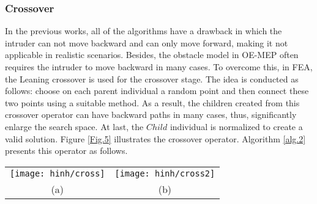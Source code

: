\documentclass[final]{elsarticle}
\begin{document}
\subsubsection{Crossover}

In the previous works, all of the algorithms have a drawback in which the intruder can not move backward and can only move forward, making it not applicable in realistic scenarios. Besides, the obstacle model in OE-MEP often requires the intruder to move backward in many cases. To overcome this, in FEA, the Leaning crossover is used for the crossover stage. The idea is conducted as follows: choose on each parent individual a random point and then connect these two points using a suitable method. As a result, the children created from this crossover operator can have backward paths in many cases, thus, significantly enlarge the search space. At last, the $Child$ individual is normalized to create a valid solution. Figure \ref{Fig.5} illustrates the crossover operator. Algorithm \ref{alg.2} presents this operator as follows.

\begin{algorithm}[H]
	\SetAlgoLined
	\caption{\textbf{Crossover operator}} 
	\label{alg.2}
\end{algorithm} 
\begin{figure*}[h]
	\begin{tabular}{cc}
		\texttt{[image: hinh/cross]}&\texttt{[image: hinh/cross2]}\\
		(a) & (b)\\
	\end{tabular}
	\centering
	\caption{Illustration of Leaning crossover operator
	}
	\label{Fig.5}       %
\end{figure*}
\end{document}
